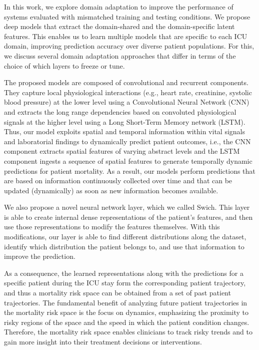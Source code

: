 In this work, we explore domain adaptation to improve the performance of systems evaluated with mismatched training and testing conditions. We propose deep models that extract the domain-shared and the domain-specific latent features. This enables us to learn multiple models that are specific to each ICU domain, improving prediction accuracy over diverse patient populations. For this, we discuss several domain adaptation approaches that differ in terms of the choice of which layers to freeze or tune.

The proposed models are composed of convolutional and recurrent components. They capture local physiological interactions (e.g., heart rate, creatinine, systolic blood pressure) at the lower level using a Convolutional Neural Network (CNN) and extracts the long range dependencies based on convoluted physiological signals at the higher level using a Long Short-Term Memory network (LSTM). Thus, our model exploits spatial and temporal information within vital signals and laboratorial findings to dynamically predict patient outcomes, i.e., the CNN component extracts spatial features of varying abstract levels and the LSTM component ingests a sequence of spatial features to generate temporally dynamic predictions for patient mortality. As a result, our models perform predictions that are based on information continuously collected over time and that can be updated (dynamically) as soon as new information becomes available.

We also propose a novel neural network layer, which we called Swich. This layer is able to create internal dense representations of the patient's features, and then use those representations to modify the features themselves. With this modifications, our layer is able to find different distributions along the dataset, identify which distribution the patient belongs to, and use that information to improve the prediction.

As a consequence, the learned representations along with the predictions for a specific patient during the ICU stay form the corresponding patient trajectory, and thus a mortality risk space can be  obtained from a set of past patient trajectories. The fundamental benefit of analyzing future patient trajectories in the mortality risk space is the focus on dynamics, emphasizing the proximity to risky regions of the space and the speed in which the patient condition changes. Therefore, the mortality risk space enables clinicians to track risky trends and to gain more insight into their treatment decisions or interventions.

